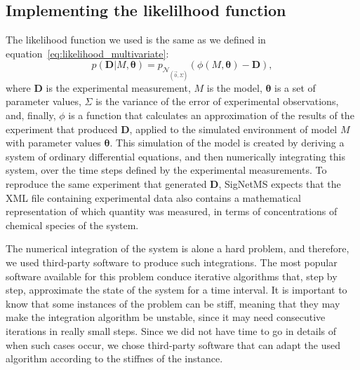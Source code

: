 
\subsection{Implementing the likelilhood function}
The likelihood function we used is the same as we defined in
equation~\ref{eq:likelihood_multivariate}:
\begin{equation*}
    p ({\bm D} | M,{\bm \theta}) = 
        p_{\mathcal{N}_{\left(\vec{0}, \Sigma\right)}}
        (\phi (M, {\bm\theta}) - {\bm D}),
\end{equation*}
where ${\bm D}$ is the experimental measurement, $M$ is the model,
${\bm \theta}$ is a set of parameter values, $\Sigma$ is the variance of
the error of experimental observations, and, finally, $\phi$ is a 
function that calculates an approximation of the results of the
experiment that produced ${\bm D}$, applied to the simulated environment
of model $M$ with parameter values ${\bm \theta}$. This simulation of
the model is created by deriving a system of ordinary differential
equations, and then numerically integrating this system, over the time
steps defined by the experimental measurements. To reproduce the same
experiment that generated ${\bm D}$, SigNetMS expects that the XML file 
containing experimental data also contains a mathematical representation
of which quantity was measured, in terms of concentrations of chemical
species of the system.

The numerical integration of the system is alone a hard problem, and
therefore, we used third-party software to produce such integrations.
The most popular software available for this problem conduce
iterative algorithms that, step by step, approximate the state of the
system for a time interval. It is important to know that some instances
of the problem can be stiff, meaning that they may make the integration
algorithm be unstable, since it may need consecutive iterations in 
really small steps. Since we did not have time to go in details of when 
such cases occur, we chose third-party software that can adapt the used
algorithm according to the stiffnes of the instance.

